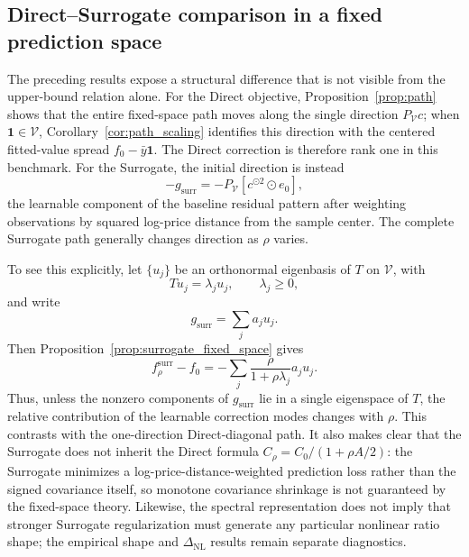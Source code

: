 \documentclass[10pt]{article}
\theoremstyle{definition}
\newcommand{\1}{\mathbf{1}}
\newcommand{\Vcal}{\mathcal{V}}
\begin{document}
\subsection{Direct--Surrogate comparison in a fixed prediction space}

{
The preceding results expose a structural difference that is not visible from the upper-bound relation alone. For the Direct objective, Proposition~\ref{prop:path} shows that the entire fixed-space path moves along the single direction $P_{\Vcal}c$; when $\1\in\Vcal$, Corollary~\ref{cor:path_scaling} identifies this direction with the centered fitted-value spread $f_0-\bar y\1$. The Direct correction is therefore rank one in this benchmark. For the Surrogate, the initial direction is instead
\[
-g_{\mathrm{surr}}
=
-P_{\Vcal}
\left[c^{\odot2}\odot e_0\right],
\]
the learnable component of the baseline residual pattern after weighting observations by squared log-price distance from the sample center. The complete Surrogate path generally changes direction as $\rho$ varies.}

{
To see this explicitly, let $\{u_j\}$ be an orthonormal eigenbasis of $T$ on $\Vcal$, with
\[
Tu_j=\lambda_j u_j,
\qquad
\lambda_j\geq0,
\]
and write
\[
g_{\mathrm{surr}}=\sum_j a_j u_j.
\]
Then Proposition~\ref{prop:surrogate_fixed_space} gives
\begin{equation}
\label{eq:surrogate_spectral_path}
f_\rho^{\mathrm{surr}}-f_0
=
-\sum_j
\frac{\rho}{1+\rho\lambda_j}
a_j u_j.
\end{equation}
Thus, unless the nonzero components of $g_{\mathrm{surr}}$ lie in a single eigenspace of $T$, the relative contribution of the learnable correction modes changes with $\rho$. This contrasts with the one-direction Direct-diagonal path. It also makes clear that the Surrogate does not inherit the Direct formula
$C_\rho=C_0/(1+\rho A/2)$: the Surrogate minimizes a log-price-distance-weighted prediction loss rather than the signed covariance itself, so monotone covariance shrinkage is not guaranteed by the fixed-space theory. Likewise, the spectral representation does not imply that stronger Surrogate regularization must generate any particular nonlinear ratio shape; the empirical shape and $\Delta_{\mathrm{NL}}$ results remain separate diagnostics.}

\end{document}
